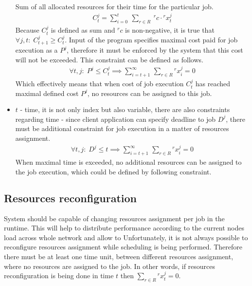 \begin{itemize}
	      Sum of all allocated resources for their time for the particular job.
	      \begin{align*}
	      	C_{t}^{j} = \sum_{i = 0}^{t}\:\sum_{r \in R}\: {}^{r}c \cdot {}^{r}x_{t}^{j} 
	      \end{align*}
	      Because $C_{t}^{j}$ is defined as sum and ${}^{r}c$ is non-negative,
	      it is true that $\forall j, t:\; C_{t+1}^{j} \geq C_{t}^{j}$.
	      Input of the program specifies maximal cost paid for job execution as a $P^j$, 
	      therefore it must be enforced by the system that this cost will not be exceeded.
	      This constraint can be defined as follows.
	      \begin{align*}
	      	\forall t, j:\; P^{j} \leq C_{t}^{j} \implies \sum_{i = t+1}^{\infty} \, \sum_{r \in R} {}^{r}x_{i}^{j} = 0 
	      \end{align*}
	      Which effectively means that when cost of job execution $C_{t}^{j}$ has reached maximal defined cost $P^{j}$,
	      no resources can be assigned to this job.
	\item $t$ - time, it is not only index but also variable, there are also constraints regarding time -
	      since client application can specify deadline to job $D^{j}$,
	      there must be additional constraint for job execution in a matter of resources assignment.
	      \begin{align*}
	      	\forall t, j:\; D^{j} \leq t \implies \sum_{i = t+1}^{\infty} \, \sum_{r \in R} {}^{r}x_{i}^{j} = 0 
	      \end{align*}
	      When maximal time is exceeded, no additional resources can be assigned to the job execution, 
	      which could be defined by following constraint.
\end{itemize}

\subsection{Resources reconfiguration}\label{subsec:resource-config}
System should be capable of changing resources assignment per job in the runtime.
This will help to distribute performance according to the current nodes load across whole network
and allow to 
Unfortunately, it is not always possible to reconfigure resources assignment while scheduling is being performed.
Therefore there must be at least one time unit, between different resources assignment,
where no resources are assigned to the job.
In other words, if resources reconfiguration is being done in time $t$ then $\sum_{r \in R} {}^{r}x_{t}^{j} = 0$.

